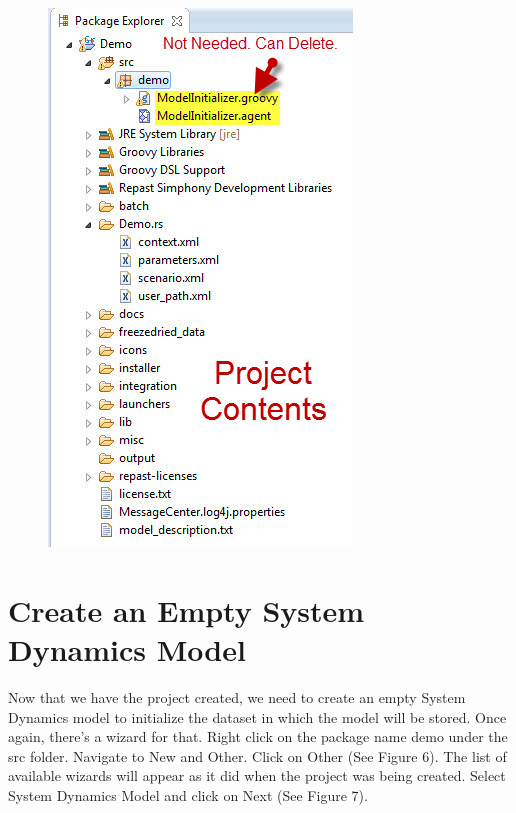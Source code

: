 \documentclass[11pt]{amsart}
\begin{document}
\begin{figure}[ht]
\begin{center}
\vspace{.2in}
\centerline {
\includegraphics[totalheight=0.35\textheight]{images/005.jpg}
}
\caption{}
\label{fig:005}
\end{center}
\end{figure}

\section{Create an Empty System Dynamics Model}
Now that we have the project created, we need to create an empty System Dynamics model to initialize the dataset in which the model will be stored. Once again, there’s a wizard for that. Right click on the package name demo under the src folder. Navigate to New and Other. Click on Other (See Figure 6). The list of available wizards will appear as it did when the project was being created. Select System Dynamics Model and click on Next (See Figure 7).
\end{document}
